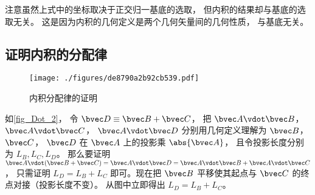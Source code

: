 注意虽然上式中的坐标取决于正交归一基底的选取， 但内积的结果却与基底的选取无关。 这是因为内积的几何定义是两个几何矢量间的几何性质， 与基底无关。

\subsection{证明内积的分配律}
\begin{figure}[ht]
\centering
\texttt{[image: ./figures/de8790a2b92cb539.pdf]}
\caption{内积分配律的证明} \label{fig_Dot_2}
\end{figure}

如\autoref{fig_Dot_2}， 令 $\bvec D \equiv \bvec B + \bvec C$， 把 $\bvec A \vdot \bvec B$，  $\bvec A \vdot \bvec C$，  $\bvec A \vdot \bvec D$ 分别用几何定义理解为 $\bvec B$，  $\bvec C$，  $\bvec D$ 在 $\bvec A$ 上的投影乘 $\abs{\bvec A}$， 且令投影长度分别为 $L_B, L_C, L_D$。 那么要证明 $\bvec A \vdot (\bvec B + \bvec C) = \bvec A \vdot \bvec D = \bvec A \vdot \bvec B + \bvec A \vdot \bvec C$， 只需证明 $L_D = L_B + L_C$ 即可。现在把 $\bvec B$ 平移使其起点与 $\bvec C$ 的终点对接（投影长度不变）。 从图中立即得出 $L_D = L_B + L_C$。  
